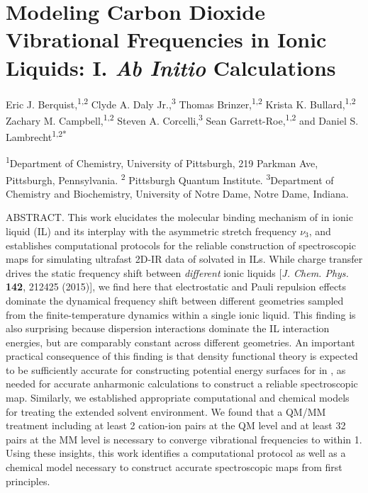 \chapter{Modeling Carbon Dioxide Vibrational Frequencies in Ionic Liquids: I. \textit{Ab Initio} Calculations}
\label{ch:paper_02}

Eric J. Berquist,\textsuperscript{1,2} Clyde A. Daly Jr.,\textsuperscript{3} Thomas Brinzer,\textsuperscript{1,2} Krista K. Bullard,\textsuperscript{1,2} Zachary M. Campbell,\textsuperscript{1,2} Steven A. Corcelli,\textsuperscript{3} Sean Garrett-Roe,\textsuperscript{1,2} and Daniel S. Lambrecht\textsuperscript{1,2*}

\textsuperscript{1}Department of Chemistry, University of Pittsburgh, 219 Parkman Ave, Pittsburgh, Pennsylvania. \textsuperscript{2} Pittsburgh Quantum Institute. \textsuperscript{3}Department of Chemistry and Biochemistry, University of Notre Dame, Notre Dame, Indiana.

ABSTRACT. This work elucidates the molecular binding mechanism of  in \ce{[C4C1im][PF6]} ionic liquid (IL) and its interplay with the  asymmetric stretch frequency \(\nu_{3}\), and establishes computational protocols for the reliable construction of spectroscopic maps for simulating ultrafast 2D-IR data of  solvated in ILs. While charge transfer drives the static frequency shift between \emph{different} ionic liquids {[}\emph{J. Chem. Phys.}  \textbf{142}, 212425 (2015){]}, we find here that electrostatic and Pauli repulsion effects dominate the dynamical frequency shift between different geometries sampled from the finite-temperature dynamics within a single ionic liquid. This finding is also surprising because dispersion interactions dominate the \textendash{}IL interaction energies, but are comparably constant across different geometries. An important practical consequence of this finding is that density functional theory is expected to be sufficiently accurate for constructing potential energy surfaces for  in \ce{[C4C1im][PF6]}, as needed for accurate anharmonic calculations to construct a reliable spectroscopic map. Similarly, we established appropriate computational and chemical models for treating the extended solvent environment. We found that a QM/MM treatment including at least \num{2} cation-ion pairs at the QM level and at least \num{32} pairs at the MM level is necessary to converge vibrational frequencies to within \SI{1}{\wavenumber}. Using these insights, this work identifies a computational protocol as well as a chemical model necessary to construct accurate spectroscopic maps from first principles.


